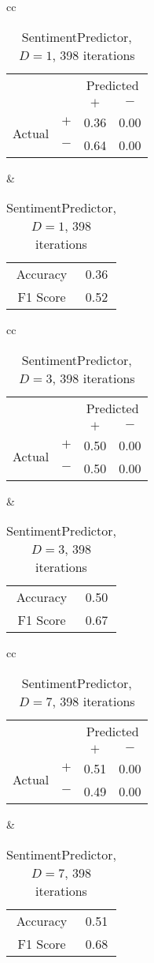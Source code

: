 \documentclass[twocolumn,10pt]{asme2ej}
\begin{document}
\begin{table}
  \begin{tabular}{cc}
    \begin{tabular}{cc|cc}
      & & \multicolumn{2}{c}{Predicted} \\
      & & $+ $ & $-$ \\
      \hline
      \multirow{2}{*}{Actual}
      & $+$ & 0.36 & 0.00 \\
      & $-$ & 0.64 & 0.00 \\
      \hline
    \end{tabular}
    &
    \begin{tabular}{cc}
      Accuracy & 0.36 \\
      F1 Score & 0.52 \\
    \end{tabular}
  \end{tabular}
  \caption{SentimentPredictor, $D=1$, 398 iterations}
  \label{pred-perf-SentimentPredictor-1-398}
\end{table}


\begin{table}
  \begin{tabular}{cc}
    \begin{tabular}{cc|cc}
      & & \multicolumn{2}{c}{Predicted} \\
      & & $+ $ & $-$ \\
      \hline
      \multirow{2}{*}{Actual}
      & $+$ & 0.50 & 0.00 \\
      & $-$ & 0.50 & 0.00 \\
      \hline
    \end{tabular}
    &
    \begin{tabular}{cc}
      Accuracy & 0.50 \\
      F1 Score & 0.67 \\
    \end{tabular}
  \end{tabular}
  \caption{SentimentPredictor, $D=3$, 398 iterations}
  \label{pred-perf-SentimentPredictor-3-398}
\end{table}


\begin{table}
  \begin{tabular}{cc}
    \begin{tabular}{cc|cc}
      & & \multicolumn{2}{c}{Predicted} \\
      & & $+ $ & $-$ \\
      \hline
      \multirow{2}{*}{Actual}
      & $+$ & 0.51 & 0.00 \\
      & $-$ & 0.49 & 0.00 \\
      \hline
    \end{tabular}
    &
    \begin{tabular}{cc}
      Accuracy & 0.51 \\
      F1 Score & 0.68 \\
    \end{tabular}
  \end{tabular}
  \caption{SentimentPredictor, $D=7$, 398 iterations}
  \label{pred-perf-SentimentPredictor-7-398}
\end{table}
\end{document}
